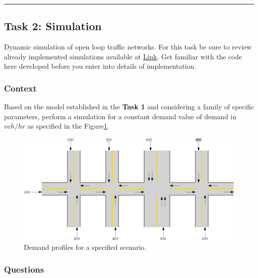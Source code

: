 \documentclass[]{book}
\theoremstyle{definition}
\theoremstyle{definition}
\theoremstyle{definition}
\theoremstyle{remark}
\begin{document}
\begin{center}\rule{0.5\linewidth}{\linethickness}\end{center}

\hypertarget{task-2-simulation}{%
\subsection*{Task 2: Simulation}\label{task-2-simulation}}

Dynamic simulation of open loop traffic networks. For this task be sure
to review already implemented simulations available at
\href{https://github.com/andres-ladino-ifsttar/traffic-macrosimulator}{Link}.
Get familiar with the code here developed before you enter into details
of implementation.

\hypertarget{context-2}{%
\subsubsection*{Context}\label{context-2}}

Based on the model established in the \textbf{Task 1} and considering a
family of specific parameters, perform a simulation for a constant
demand value of demand in \(veh/hr\) as specified in the
Figure\ref{fig:flow}.



\begin{figure}

{\centering \includegraphics{images/p1-02-flows} 

}

\caption{Demand profiles for a specified scenario.}\label{fig:flow}
\end{figure}

\hypertarget{questions-1}{%
\subsubsection*{Questions}\label{questions-1}}
\end{document}
